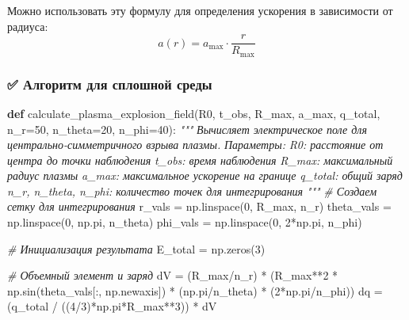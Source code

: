 \documentclass[11pt]{article}
\newenvironment{Shaded}{}{}
\newcommand{\KeywordTok}[1]{\textcolor[rgb]{0.00,0.44,0.13}{\textbf{{#1}}}}
\newcommand{\DecValTok}[1]{\textcolor[rgb]{0.25,0.63,0.44}{{#1}}}
\newcommand{\CommentTok}[1]{\textcolor[rgb]{0.38,0.63,0.69}{\textit{{#1}}}}
\newcommand{\NormalTok}[1]{{#1}}
\newcommand{\OperatorTok}[1]{\textcolor[rgb]{0.40,0.40,0.40}{{#1}}}
\begin{document}
Можно использовать эту формулу для определения ускорения в зависимости
от радиуса: \[
a(r) = a_{\text{max}} \cdot \frac{r}{R_{\text{max}}}
\]

\subsubsection{✅ Алгоритм для сплошной
среды}\label{ux430ux43bux433ux43eux440ux438ux442ux43c-ux434ux43bux44f-ux441ux43fux43bux43eux448ux43dux43eux439-ux441ux440ux435ux434ux44b}

\begin{Shaded}
\begin{Highlighting}[]
\KeywordTok{def}\NormalTok{ calculate_plasma_explosion_field(R0, t_obs, R_max, a_max, q_total, }
\NormalTok{                                   n_r}\OperatorTok{=}\DecValTok{50}\NormalTok{, n_theta}\OperatorTok{=}\DecValTok{20}\NormalTok{, n_phi}\OperatorTok{=}\DecValTok{40}\NormalTok{):}
    \CommentTok{"""}
\CommentTok{    Вычисляет электрическое поле для центрально-симметричного взрыва плазмы.}
\CommentTok{    }
\CommentTok{    Параметры:}
\CommentTok{    R0: расстояние от центра до точки наблюдения}
\CommentTok{    t_obs: время наблюдения}
\CommentTok{    R_max: максимальный радиус плазмы}
\CommentTok{    a_max: максимальное ускорение на границе}
\CommentTok{    q_total: общий заряд}
\CommentTok{    n_r, n_theta, n_phi: количество точек для интегрирования}
\CommentTok{    """}
    \CommentTok{# Создаем сетку для интегрирования}
\NormalTok{    r_vals }\OperatorTok{=}\NormalTok{ np.linspace(}\DecValTok{0}\NormalTok{, R_max, n_r)}
\NormalTok{    theta_vals }\OperatorTok{=}\NormalTok{ np.linspace(}\DecValTok{0}\NormalTok{, np.pi, n_theta)}
\NormalTok{    phi_vals }\OperatorTok{=}\NormalTok{ np.linspace(}\DecValTok{0}\NormalTok{, }\DecValTok{2}\OperatorTok{*}\NormalTok{np.pi, n_phi)}

    \CommentTok{# Инициализация результата}
\NormalTok{    E_total }\OperatorTok{=}\NormalTok{ np.zeros(}\DecValTok{3}\NormalTok{)}

    \CommentTok{# Объемный элемент и заряд}
\NormalTok{    dV }\OperatorTok{=}\NormalTok{ (R_max}\OperatorTok{/}\NormalTok{n_r) }\OperatorTok{*}\NormalTok{ (R_max}\OperatorTok{**}\DecValTok{2} \OperatorTok{*}\NormalTok{ np.sin(theta_vals[:, np.newaxis]) }\OperatorTok{*}
\NormalTok{             (np.pi}\OperatorTok{/}\NormalTok{n_theta) }\OperatorTok{*}\NormalTok{ (}\DecValTok{2}\OperatorTok{*}\NormalTok{np.pi}\OperatorTok{/}\NormalTok{n_phi))}
\NormalTok{    dq }\OperatorTok{=}\NormalTok{ (q_total }\OperatorTok{/}\NormalTok{ ((}\DecValTok{4}\OperatorTok{/}\DecValTok{3}\NormalTok{)}\OperatorTok{*}\NormalTok{np.pi}\OperatorTok{*}\NormalTok{R_max}\OperatorTok{**}\DecValTok{3}\NormalTok{)) }\OperatorTok{*}\NormalTok{ dV}


\end{Highlighting}
\end{Shaded}
\end{document}
